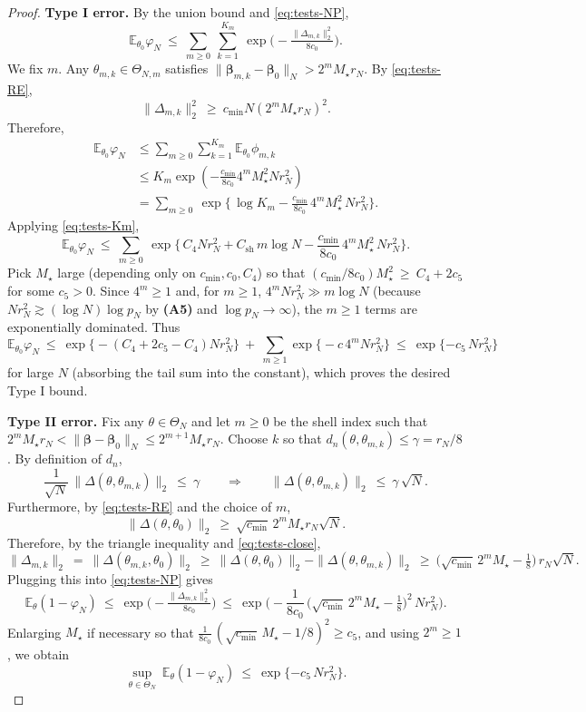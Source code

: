\documentclass[11pt]{article}
\theoremstyle{plain}
\theoremstyle{definition}
\theoremstyle{plain}
\begin{document}
\begin{proof}
\medskip
\textbf{Type I error.}
By the union bound and \eqref{eq:tests-NP},
\[
\mathbb E_{\theta_0}\varphi_N \ \le\ \sum_{m\ge 0}\ \sum_{k=1}^{K_m}\ \exp\!\Big(-\tfrac{\|\Delta_{m,k}\|_2^2}{8c_0}\Big).
\]
We fix $m$. Any $\theta_{m,k}\in\Theta_{N,m}$ satisfies $\|\bm\beta_{m,k}-\bm\beta_0\|_N> 2^m M_\star r_N$. By \eqref{eq:tests-RE},
\[
\|\Delta_{m,k}\|_2^2\ \ge\ c_{\min} N (2^m M_\star r_N)^2.
\]
Therefore,
\begin{equation*}
\begin{split}
\mathbb E_{\theta_0}\varphi_N & \le \sum_{m \ge 0}\sum_{k=1}^{K_m} \mathbb{E}_{\theta_0} \phi_{m,k} \\
& \le K_m \exp \left(-\frac{c_{\min}}{8c_0} 4^m M_{\star} ^2 N r_N ^2 \right)\\
& =\sum_{m\ge 0}\ \exp\!\Big\{\,\log K_m - \frac{c_{\min}}{8c_0}\,4^m M_\star^2\,N r_N^2\Big\}.
\end{split}
\end{equation*}
Applying \eqref{eq:tests-Km},
\[
\mathbb E_{\theta_0}\varphi_N
\ \le\ \sum_{m\ge 0}\ \exp\!\Big\{\,C_4 N r_N^2 + C_{\mathrm{sh}}\,m\log N - \frac{c_{\min}}{8c_0}\,4^m M_\star^2\,N r_N^2\Big\}.
\]
Pick $M_\star$ large (depending only on $c_{\min},c_0,C_4$) so that
\(
({c_{\min}}/{8c_0})M_\star^2 \ \ge\ C_4 + 2c_5
\)
for some $c_5>0$. Since $4^m\ge 1$ and, for $m\ge 1$, $4^m N r_N^2 \gg m\log N$ (because $N r_N^2 \gtrsim (\log N)\log p_N$ by \textbf{(A5)} and $\log p_N\to\infty$), the $m\ge 1$ terms are exponentially dominated. Thus
\[
\mathbb E_{\theta_0}\varphi_N
\ \le\ \exp\!\big\{-(C_4+2c_5-C_4)N r_N^2\big\}\ +\ \sum_{m\ge 1} \exp\!\big\{-c\,4^m N r_N^2\big\}
\ \le\ \exp\{-c_5\,N r_N^2\}
\]
for large $N$ (absorbing the tail sum into the constant), which proves the desired Type I bound.

\medskip
\textbf{Type II error.}
Fix any $\theta\in\Theta_N$ and let $m\ge 0$ be the shell index such that
$2^{m}M_\star r_N<\|\bm\beta-\bm\beta_0\|_N\le 2^{m+1}M_\star r_N$.
Choose $k$ so that $d_n(\theta,\theta_{m,k})\le \gamma=r_N/8$.
By definition of $d_n$,
\begin{equation}\label{eq:tests-close}
\frac{1}{\sqrt N}\,\|\Delta(\theta,\theta_{m,k})\|_2 \ \le\ \gamma
\qquad\Longrightarrow\qquad
\|\Delta(\theta,\theta_{m,k})\|_2 \ \le\ \gamma\,\sqrt N.
\end{equation}
Furthermore, by \eqref{eq:tests-RE} and the choice of $m$,
\[
\|\Delta(\theta,\theta_0)\|_2 \ \ge\ \sqrt{c_{\min}}\,2^{m}M_\star r_N \sqrt N.
\]
Therefore, by the triangle inequality and \eqref{eq:tests-close},
\[
\|\Delta_{m,k}\|_2
\ =\ \|\Delta(\theta_{m,k},\theta_0)\|_2
\ \ge\ \|\Delta(\theta,\theta_0)\|_2 - \|\Delta(\theta,\theta_{m,k})\|_2
\ \ge\ \Big(\sqrt{c_{\min}}\,2^{m}M_\star - \tfrac18\Big)\,r_N \sqrt N.
\]
Plugging this into \eqref{eq:tests-NP} gives
\[
\mathbb E_{\theta}(1-\varphi_N)
\ \le\ \exp\!\Big(-\tfrac{\|\Delta_{m,k}\|_2^2}{8c_0}\Big)
\ \le\ \exp\!\Big(- \frac{1}{8c_0}\,\big(\sqrt{c_{\min}}\,2^{m}M_\star - \tfrac18\big)^2\,N r_N^2\Big).
\]
Enlarging $M_\star$ if necessary so that $\frac{1}{8c_0}\,(\sqrt{c_{\min}}\,M_\star - 1/8)^2\ge c_5$, and using $2^m\ge 1$, we obtain
\[
\sup_{\theta\in\Theta_N}\ \mathbb E_{\theta}(1-\varphi_N) \ \le\ \exp\{-c_5\,N r_N^2\}.
\]


\end{proof}
\end{document}
